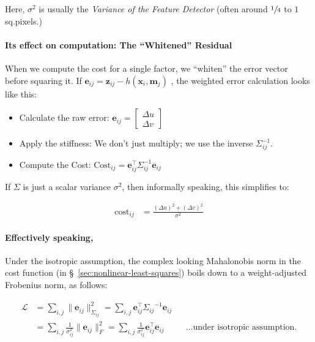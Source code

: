 \documentclass[11pt]{article}
\begin{document}
Here, \(\sigma^2\) is usually the \emph{Variance of the
Feature Detector} (often around \(\sfrac14\) to \(1\)
sq.pixels.)
\paragraph*{Its effect on computation: The ``Whitened'' Residual}
\label{sec:orgdd9ce88}
When we compute the cost for a single factor, we
``whiten'' the error vector before squaring it.  If
\(\mathbf{e}_{ij} = \mathbf{z}_{ij} - h(\mathbf{x}_i,
\mathbf{m}_j)\) , the weighted error calculation looks
like this:

\begin{itemize}
\item Calculate the raw error: \(\mathbf{e}_{ij}
  = \begin{bmatrix} \Delta u \\ \Delta v \end{bmatrix}\)
\item Apply the stiffness: We don't just multiply; we use
the inverse \(\Sigma_{ij}^{-1}\).
\item Compute the Cost: \(\text{Cost}_{ij} =
  \mathbf{e}_{ij}^{\top} \Sigma_{ij}^{-1}
  \mathbf{e}_{ij}\)
\end{itemize}

If \(\Sigma\) is just a scalar variance \(\sigma^2\), then
informally speaking, this simplifies to:

\begin{align*}
  \text{cost}_{ij}
  &= \frac{(\Delta u)^2 + (\Delta v)^2}{\sigma^2}
\end{align*}
\paragraph*{Effectively speaking,}
\label{sec:org4a9555f}

Under the isotropic assumption, the complex looking
Mahalonobis norm in the cost function (in
\S~\ref{sec:nonlinear-least-squares}) boils
down to a weight-adjusted Frobenius norm, as follows:

\begin{align*}
  \mathcal{L}
  &= \sum_{i,j} \|\mathbf{e}_{ij}\|_{\Sigma_{ij}}^2
    = \sum_{i,j} \mathbf{e}_{ij}^{\top}
    {\Sigma_{ij}}^{-1} \mathbf{e}_{ij}
  \\
  &= \sum_{i,j} \frac{1}{\sigma_{ij}^2}
    \|\mathbf{e}_{ij}\|_{F}^2
    = \sum_{i,j} \frac{1}{\sigma_{ij}^2}
    \mathbf{e}_{ij}^{\top} \mathbf{e}_{ij}
  && \text{\ldots under isotropic assumption.}
\end{align*}
\end{document}
